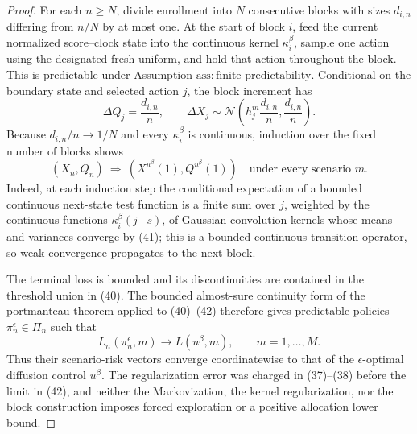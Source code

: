 \documentclass{article}
\begin{document}
\begin{proof}
For each \(n\geq N\), divide enrollment into \(N\) consecutive blocks with sizes \(d_{i,n}\) differing from \(n/N\) by at most one.  At the start of block \(i\), feed the current normalized score--clock state into the continuous kernel \(\kappa_i^\beta\), sample one action using the designated fresh uniform, and hold that action throughout the block.  This is predictable under Assumption \(\mathrm{ass{:}finite\text{-}predictability}\).  Conditional on the boundary state and selected action \(j\), the block increment has
\[
 \Delta Q_j=\frac{d_{i,n}}n,
 \qquad
 \Delta X_j\sim\mathcal N\!\left(h_j^m\frac{d_{i,n}}n,
                                      \frac{d_{i,n}}n\right).    \tag{41}
\]
Because \(d_{i,n}/n\to1/N\) and every \(\kappa_i^\beta\) is continuous, induction over the fixed number of blocks shows
\[
 (X_n,Q_n)\ \Longrightarrow\ (X^{u^\beta}(1),Q^{u^\beta}(1))
 \quad\text{under every scenario }m.                            \tag{42}
\]
Indeed, at each induction step the conditional expectation of a bounded continuous next-state test function is a finite sum over \(j\), weighted by the continuous functions \(\kappa_i^\beta(j\mid s)\), of Gaussian convolution kernels whose means and variances converge by (41); this is a bounded continuous transition operator, so weak convergence propagates to the next block.

The terminal loss is bounded and its discontinuities are contained in the threshold union in (40).  The bounded almost-sure continuity form of the portmanteau theorem applied to (40)--(42) therefore gives predictable policies \(\pi_n^\epsilon\in\Pi_n\) such that
\[
 L_n(\pi_n^\epsilon,m)\longrightarrow L(u^\beta,m),
 \qquad m=1,\ldots,M.                                           \tag{43}
\]
Thus their scenario-risk vectors converge coordinatewise to that of the \(\epsilon\)-optimal diffusion control \(u^\beta\).  The regularization error was charged in (37)--(38) before the limit in (42), and neither the Markovization, the kernel regularization, nor the block construction imposes forced exploration or a positive allocation lower bound.
\end{proof}
\end{document}
